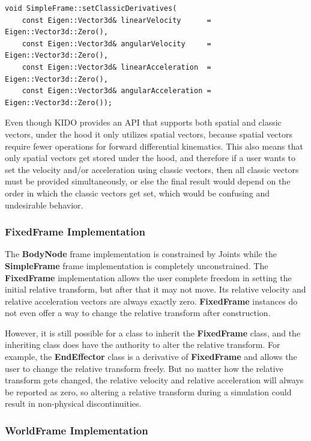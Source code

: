 \begin{lstlisting}
void SimpleFrame::setClassicDerivatives(
    const Eigen::Vector3d& linearVelocity      = Eigen::Vector3d::Zero(),
    const Eigen::Vector3d& angularVelocity     = Eigen::Vector3d::Zero(),
    const Eigen::Vector3d& linearAcceleration  = Eigen::Vector3d::Zero(),
    const Eigen::Vector3d& angularAcceleration = Eigen::Vector3d::Zero());
\end{lstlisting}

Even though KIDO provides an API that supports both spatial and classic vectors, under the hood it only utilizes spatial vectors, because spatial vectors require fewer operations for forward differential kinematics. This also means that only spatial vectors get stored under the hood, and therefore if a user wants to set the velocity and/or acceleration using classic vectors, then all classic vectors must be provided simultaneously, or else the final result would depend on the order in which the classic vectors get set, which would be confusing and undesirable behavior.

\subsubsection{FixedFrame Implementation}

The \textbf{BodyNode} frame implementation is constrained by Joints while the \textbf{SimpleFrame} frame implementation is completely unconstrained. The \textbf{FixedFrame} implementation allows the user complete freedom in setting the initial relative transform, but after that it may not move. Its relative velocity and relative acceleration vectors are always exactly zero. \textbf{FixedFrame} instances do not even offer a way to change the relative transform after construction.

However, it is still possible for a class to inherit the \textbf{FixedFrame} class, and the inheriting class does have the authority to alter the relative transform. For example, the \textbf{EndEffector} class is a derivative of \textbf{FixedFrame} and allows the user to change the relative transform freely. But no matter how the relative transform gets changed, the relative velocity and relative acceleration will always be reported as zero, so altering a relative transform during a simulation could result in non-physical discontinuities.

\subsubsection{WorldFrame Implementation}


